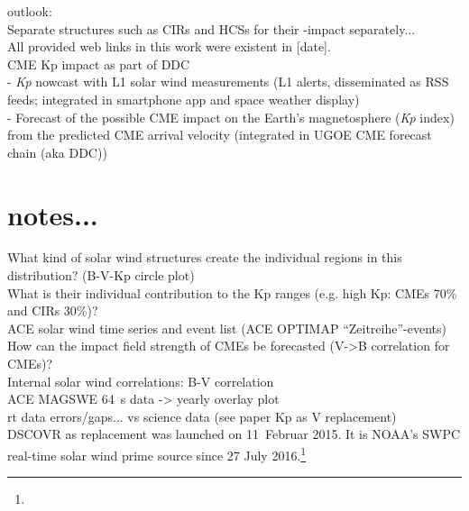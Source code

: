 outlook:\\
Separate structures such as CIRs and HCSs for their \Kp-impact separately...\\

All provided web links in this work were existent in [date].\\


CME Kp impact as part of DDC\\
- \textit{Kp} nowcast with L1 solar wind measurements (L1 alerts, disseminated as RSS feeds; integrated in smartphone app and space weather display)\\
- Forecast of the possible CME impact on the Earth's magnetosphere (\textit{Kp} index) from the predicted CME arrival velocity (integrated in UGOE CME forecast chain (aka DDC))\\


\section{notes...}

What kind of solar wind structures create the individual regions in this distribution? (B-V-Kp circle plot)\\
What is their individual contribution to the Kp ranges (e.g. high Kp: CMEs 70\% and CIRs 30\%)?\\

ACE solar wind time series and event list (ACE OPTIMAP ``Zeitreihe''-events)\\


How can the impact field strength of CMEs be forecasted (V->B correlation for CMEs)?\\
Internal solar wind correlations: B-V correlation\\
ACE MAGSWE 64~s data -> yearly overlay plot\\


rt data errors/gaps... vs science data (see paper Kp as V replacement)\\
DSCOVR as replacement was launched on 11~Februar 2015. It is NOAA's SWPC real-time solar wind prime source since 27 July 2016.\footnote{}\\


